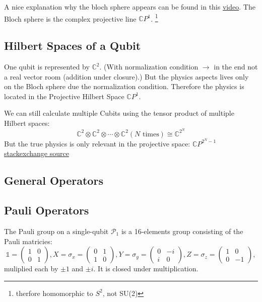 A nice explanation why the bloch sphere appears can be found in this \href{https://www.youtube.com/watch?v=KEzmw6cKOlU}{video}.
The Bloch sphere is the complex projective line $\mathbb{C}P^1$. \footnote{therfore homomorphic to $S^2$, not SU(2)}


\subsection{Hilbert Spaces of a Qubit}\label{sec:basic.math.hilbert_space}
One qubit is represented by $\mathbb{C}^2$. 
(With normalization condition $\rightarrow$ in the end not a real vector room (addition under closure).)
But the physics aspects lives only on the Bloch sphere due the normalization condition. 
Therefore the physics is located in the Projective Hilbert Space $\mathbb{C}P^1$.

We can still calculate multiple Cubits using the tensor product of multiple Hilbert spaces:
\begin{equation}
    \mathbb{C}^2 \otimes \mathbb{C}^2 \otimes \cdots \otimes \mathbb{C}^2 (N \text{ times}) \cong \mathbb{C}^{2^N}
\end{equation} 
But the true physics is only relevant in the projective space: $\mathbb{C}P^{2^N - 1}$
\href{https://quantumcomputing.stackexchange.com/questions/27059/what-is-the-actual-hilbert-space-of-a-n-qubit-system}{stackexchange source}


\subsection{General Operators}


\subsection{Pauli Operators}\label{sec:basic.math.pauli_operator}
The Pauli group on a single-qubit $\mathcal{P}_1$ is a 16-elements group consisting of the Pauli matricies: 
\begin{equation}
\mathds{1} = 
\begin{pmatrix}1&0\\0&1\end{pmatrix},
X = \sigma_x =
\begin{pmatrix}0&1\\1&0\end{pmatrix},
Y = \sigma_y =
\begin{pmatrix}0&-i\\i&0\end{pmatrix} ,
Z = \sigma_z =
\begin{pmatrix}1&0\\0&-1\end{pmatrix} ,
\label{eq:basic.math.pauli_matricies}
\end{equation}
muliplied each by $\pm1$ and $\pm i$. 
It is closed under multiplication. 

